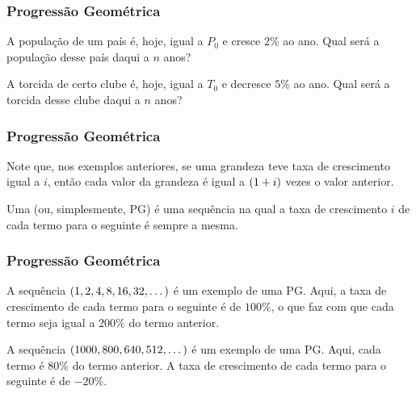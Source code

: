 \documentclass[brazil, notheorems, 10pt]{beamer}
\begin{document}

\begin{frame}
\frametitle{Progressão Geométrica} %

\begin{Exem}
A população de um país é, hoje, igual a $P_0$ e cresce $2 \%$ ao ano.
Qual será a população desse país daqui a $n$ anos?
\end{Exem}\pause

\begin{Exem}
A torcida de certo clube é, hoje, igual a $T_0$ e decresce $5\%$ ao
ano. Qual será a torcida desse clube daqui a $n$ anos?
\end{Exem}


\end{frame}



\begin{frame}
\frametitle{Progressão Geométrica} %

Note que, nos exemplos anteriores, se uma grandeza teve taxa de
crescimento igual a $i$, então cada valor da grandeza é igual a
$\left(1+i\right)$ vezes o valor anterior.

\begin{Def}
Uma  (ou, simplesmente, PG) é uma sequência
na qual a taxa de crescimento $i$ de cada termo para o seguinte é
sempre a mesma.
\end{Def}


\end{frame}




\begin{frame}
\frametitle{Progressão Geométrica} %

\begin{Exem}
A sequência $\left(1, 2, 4, 8, 16, 32, \dots \right)$ é um exemplo de uma
PG. Aqui, a taxa de crescimento de cada termo para o seguinte é de
$100 \% $, o que faz com que cada termo seja igual a $200 \% $ do
termo anterior.
\end{Exem}

\begin{Exem}
A sequência $\left(1000, 800, 640, 512 , \dots \right)$ é um exemplo de
uma PG. Aqui, cada termo é $80 \% $ do termo anterior. A taxa de
crescimento de cada termo para o seguinte é de $ -20 \% $.
\end{Exem}

\end{frame}
\end{document}
